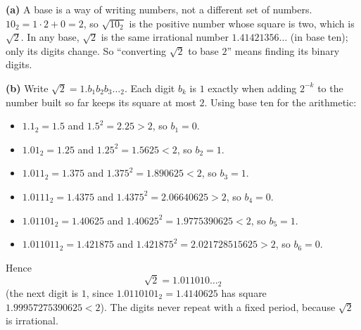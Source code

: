 \textbf{(a)} A base is a way of writing numbers, not a different set of numbers. $10_2=1\cdot2+0=2$, so $\sqrt{10_2}$ is the positive number whose square is two, which is $\sqrt2$. In any base, $\sqrt2$ is the same irrational number $1.41421356\ldots$ (in base ten); only its digits change. So ``converting $\sqrt2$ to base $2$'' means finding its binary digits.

\textbf{(b)} Write $\sqrt2=1.b_1b_2b_3\ldots{}_2$. Each digit $b_k$ is $1$ exactly when adding $2^{-k}$ to the number built so far keeps its square at most $2$. Using base ten for the arithmetic:
\begin{itemize}
\item $1.1_2=1.5$ and $1.5^2=2.25>2$, so $b_1=0$.
\item $1.01_2=1.25$ and $1.25^2=1.5625<2$, so $b_2=1$.
\item $1.011_2=1.375$ and $1.375^2=1.890625<2$, so $b_3=1$.
\item $1.0111_2=1.4375$ and $1.4375^2=2.06640625>2$, so $b_4=0$.
\item $1.01101_2=1.40625$ and $1.40625^2=1.9775390625<2$, so $b_5=1$.
\item $1.011011_2=1.421875$ and $1.421875^2=2.021728515625>2$, so $b_6=0$.
\end{itemize}
Hence
\[\sqrt2=\boxed{1.011010\ldots{}_2}\]
(the next digit is $1$, since $1.0110101_2=1.4140625$ has square $1.99957275390625<2$). The digits never repeat with a fixed period, because $\sqrt2$ is irrational.
